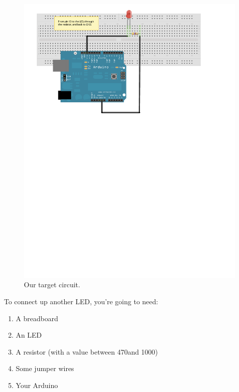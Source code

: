 \begin{figure}[ht]
  \begin{center}
    \includegraphics[width=0.95\linewidth]{images/ch2-one-led-circuit}
    \caption{Our target circuit.}
    \label{diagram:ch2-one-led-circuit}
  \end{center}
\end{figure}

\newpage

To connect up another LED, you're going to need:

\begin{enumerate}
	\item A breadboard
	\item An LED
	\item A resistor (with a value between 470\ohm and 1000\ohm)
	\item Some jumper wires
	\item Your Arduino
\end{enumerate}

